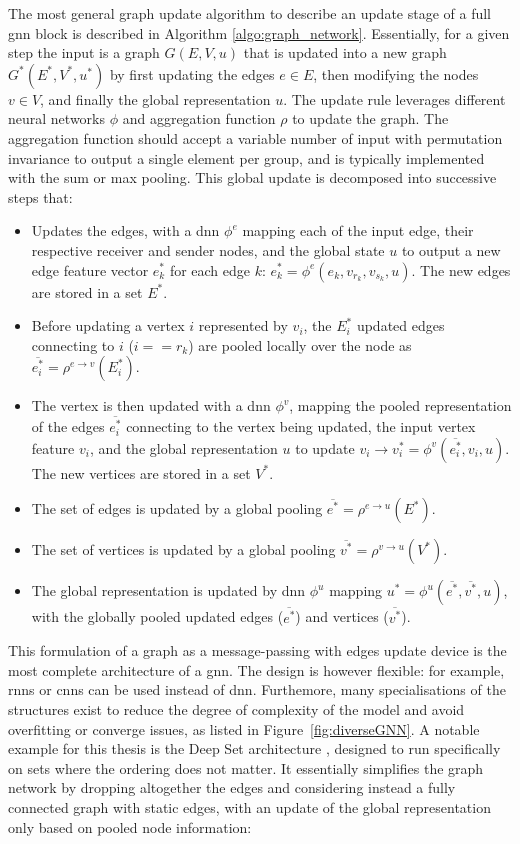 The most general graph update algorithm to describe an update stage of a full \gls{gnn} block is described in Algorithm \ref{algo:graph_network}. Essentially, for a given step the input is a graph $G(E, V, u)$ that is updated into a new graph $G^*(E^*, V^*, u^*)$ by first updating the edges $e \in E$, then modifying the nodes $v \in V$, and finally the global representation $u$. The update rule leverages different neural networks $\phi$ and aggregation function $\rho$ to update the graph. The aggregation function should accept a variable number of input with permutation invariance to output a single element per group, and is typically implemented with the sum or max pooling. This global update is decomposed into successive steps that: 
\begin{itemize}
    \item Updates the edges, with a \gls{dnn} $\phi^e$ mapping each of the input edge, their respective receiver and sender nodes, and the global state $u$ to output a new edge feature vector $e^*_k$ for each edge $k$: $e^*_k = \phi^e(e_k, v_{r_k}, v_{s_k}, u)$. The new edges are stored in a set $E^*$. 
    \item Before updating a vertex $i$ represented by $v_i$, the $E_i^*$ updated edges connecting to $i$ ($i == r_k$) are pooled locally over the node as $\overline{e^*_i} = \rho^{e \rightarrow v}(E_i^*)$.
    \item The vertex is then updated with a \gls{dnn} $\phi^v$, mapping the pooled representation of the edges $\overline{e^*_i}$ connecting to the vertex being updated, the input vertex feature $v_i$, and the global representation $u$ to update $v_i \rightarrow v^*_i = \phi^v(\overline{e^*_i}, v_i, u)$. The new vertices are stored in a set $V^*$.
    \item The set of edges is updated by a global pooling $\overline{e^*} = \rho^{e \rightarrow u}(E^*)$.
    \item The set of vertices is updated by a global pooling $\overline{v^*} = \rho^{v \rightarrow u}(V^*)$.
    \item The global representation is updated by \gls{dnn} $\phi^u$ mapping $u^* = \phi^u(\overline{e^*}, \overline{v^*}, u)$, with the globally pooled updated edges ($\overline{e^*}$) and vertices ($\overline{v^*}$). 
\end{itemize} 
This formulation of a graph as a message-passing with edges update device is the most complete architecture of a \gls{gnn}. The design is however flexible: for example, \gls{rnn}s or \gls{cnn}s can be used instead of \gls{dnn}. Furthemore, many specialisations of the structures exist to reduce the degree of complexity of the model and avoid overfitting or converge issues, as listed in Figure~\ref{fig:diverseGNN}. A notable example for this thesis is the Deep Set architecture \cite{NIPS2017f22e4747}, designed to run specifically on sets where the ordering does not matter. It essentially simplifies the graph network by dropping altogether the edges and considering instead a fully connected graph with static edges, with an update of the global representation only based on pooled node information: 
